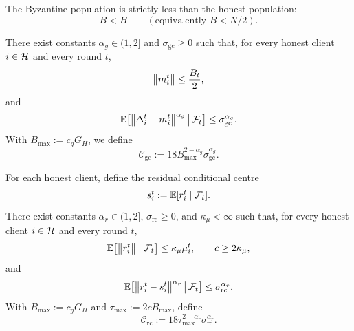 \begin{assumption}
\label{ass:honest_majority}
The Byzantine population is strictly less than the honest population:
\begin{equation}
    B < H
    \qquad(\text{equivalently } B < N/2).
    \label{eq:honest_majority}
\end{equation}
\end{assumption}

\begin{assumption}
\label{ass:global_sadiev}
There exist constants \(\alpha_g\in(1,2]\) and
\(\sigma_{\mathrm{gc}}\ge0\) such that, for every honest client \(i\in\mathcal{H}\)
and every round \(t\),
\begin{equation}
    \left\lVert m_i^t \right\rVert
    \le
    \frac{B_t}{2},
    \label{eq:global_sadiev_admissibility}
\end{equation}
and
\begin{equation}
    \mathbb{E}\!\left[
        \left\lVert \Delta_i^t-m_i^t \right\rVert^{\alpha_g}
        \,\middle|\,\mathcal{F}_t
    \right]
    \le
    \sigma_{\mathrm{gc}}^{\alpha_g}.
    \label{eq:global_sadiev_moment}
\end{equation}
With \(B_{\max}:=c_gG_H\), we define
\begin{equation}
    \mathcal C_{\mathrm{gc}}
    :=
    18B_{\max}^{2-\alpha_g}\sigma_{\mathrm{gc}}^{\alpha_g}.
    \label{eq:global_sadiev_budget_constant}
\end{equation}
\end{assumption}

\begin{assumption}
\label{ass:residual_sadiev}
For each honest client, define the residual conditional centre
\begin{equation}
    s_i^t:=\mathbb{E}[r_i^t\mid\mathcal{F}_t].
    \label{eq:residual_conditional_centre}
\end{equation}
There exist constants \(\alpha_r\in(1,2]\), \(\sigma_{\mathrm{rc}}\ge0\),
and \(\kappa_\mu<\infty\) such that, for every honest client \(i\in\mathcal{H}\) and
every round \(t\),
\begin{equation}
    \mathbb{E}\!\left[\left\lVert r_i^t \right\rVert\mid\mathcal{F}_t\right]
    \le
    \kappa_\mu\mu_i^t,
    \qquad
    c\ge 2\kappa_\mu,
    \label{eq:residual_scale_tracking}
\end{equation}
and
\begin{equation}
    \mathbb{E}\!\left[
        \left\lVert r_i^t-s_i^t \right\rVert^{\alpha_r}
        \,\middle|\,\mathcal{F}_t
    \right]
    \le
    \sigma_{\mathrm{rc}}^{\alpha_r}.
    \label{eq:residual_sadiev_moment}
\end{equation}
With \(B_{\max}:=c_gG_H\) and \(\tau_{\max}:=2cB_{\max}\), define
\begin{equation}
    \mathcal C_{\mathrm{rc}}
    :=
    18\tau_{\max}^{2-\alpha_r}\sigma_{\mathrm{rc}}^{\alpha_r}.
    \label{eq:residual_sadiev_budget_constant}
\end{equation}
\end{assumption}

